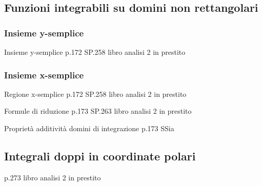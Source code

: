 \documentclass{article}  %
\begin{document}
\subsection{Funzioni integrabili su domini non rettangolari}
\subsubsection{Insieme y-semplice}
\begin{theorem}{Insieme y-semplice p.172}
	SP.258 libro analisi 2 in prestito
\end{theorem}

\subsubsection{Insieme x-semplice}
\begin{theorem}{Regione x-semplice p.172}
	SP.258 libro analisi 2 in prestito
\end{theorem}
\begin{theorem}{Formule di riduzione p.173}
	SP.263 libro analisi 2 in prestito
\end{theorem}
\begin{theorem}{Proprietà additività domini di integrazione p.173}
	SSia
\end{theorem}
\subsection{Integrali doppi in coordinate polari}
p.273 libro analisi 2 in prestito

\end{document}
